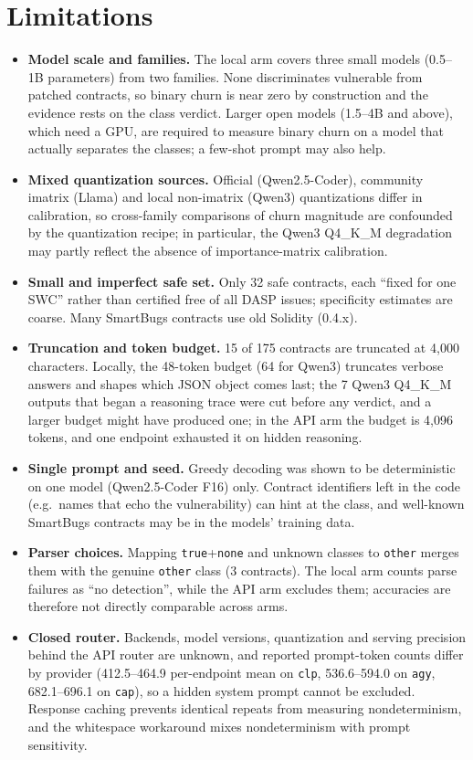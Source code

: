 \section{Limitations}\label{sec:limitations}
\begin{itemize}
\item \textbf{Model scale and families.} The local arm covers three small models (0.5--1B parameters) from two families. None discriminates vulnerable from patched contracts, so binary churn is near zero by construction and the evidence rests on the class verdict. Larger open models (1.5--4B and above), which need a GPU, are required to measure binary churn on a model that actually separates the classes; a few-shot prompt may also help.
\item \textbf{Mixed quantization sources.} Official (Qwen2.5-Coder), community imatrix (Llama) and local non-imatrix (Qwen3) quantizations differ in calibration, so cross-family comparisons of churn magnitude are confounded by the quantization recipe; in particular, the Qwen3 Q4\_K\_M degradation may partly reflect the absence of importance-matrix calibration.
\item \textbf{Small and imperfect safe set.} Only 32 safe contracts, each ``fixed for one SWC'' rather than certified free of all DASP issues; specificity estimates are coarse. Many SmartBugs contracts use old Solidity (0.4.x).
\item \textbf{Truncation and token budget.} 15 of 175 contracts are truncated at 4{,}000 characters. Locally, the 48-token budget (64 for Qwen3) truncates verbose answers and shapes which JSON object comes last; the 7 Qwen3 Q4\_K\_M outputs that began a reasoning trace were cut before any verdict, and a larger budget might have produced one; in the API arm the budget is 4{,}096 tokens, and one endpoint exhausted it on hidden reasoning.
\item \textbf{Single prompt and seed.} Greedy decoding was shown to be deterministic on one model (Qwen2.5-Coder F16) only. Contract identifiers left in the code (e.g.\ names that echo the vulnerability) can hint at the class, and well-known SmartBugs contracts may be in the models' training data.
\item \textbf{Parser choices.} Mapping \texttt{true}+\texttt{none} and unknown classes to \texttt{other} merges them with the genuine \texttt{other} class (3 contracts). The local arm counts parse failures as ``no detection'', while the API arm excludes them; accuracies are therefore not directly comparable across arms.
\item \textbf{Closed router.} Backends, model versions, quantization and serving precision behind the API router are unknown, and reported prompt-token counts differ by provider (412.5--464.9 per-endpoint mean on \texttt{clp}, 536.6--594.0 on \texttt{agy}, 682.1--696.1 on \texttt{cap}), so a hidden system prompt cannot be excluded. Response caching prevents identical repeats from measuring nondeterminism, and the whitespace workaround mixes nondeterminism with prompt sensitivity.

\end{itemize}
